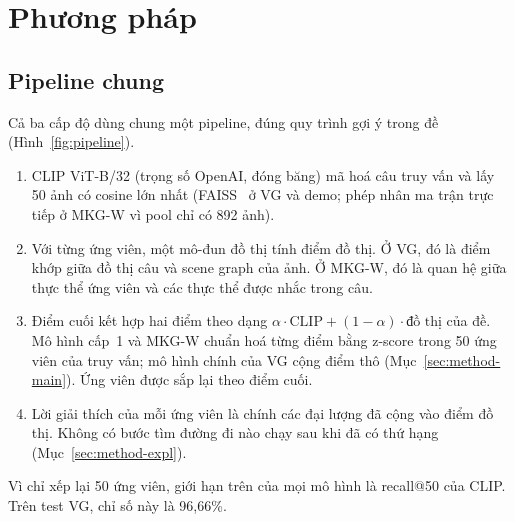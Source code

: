 \section{Phương pháp}
\label{sec:method}

\subsection{Pipeline chung}

Cả ba cấp độ dùng chung một pipeline, đúng quy trình gợi ý trong đề (Hình~\ref{fig:pipeline}).
\begin{enumerate}
\item CLIP ViT-B/32 (trọng số OpenAI, đóng băng) mã hoá câu truy vấn và lấy 50 ảnh có cosine lớn nhất (FAISS~\cite{johnson2019faiss}
ở VG và demo; phép nhân ma trận trực tiếp ở MKG-W vì pool chỉ có 892 ảnh).
\item Với từng ứng viên, một mô-đun đồ thị tính điểm đồ thị. Ở VG, đó là điểm khớp giữa đồ thị câu và scene graph của ảnh.
Ở MKG-W, đó là quan hệ giữa thực thể ứng viên và các thực thể được nhắc trong câu.
\item Điểm cuối kết hợp hai điểm theo dạng $\alpha\cdot\text{CLIP} + (1-\alpha)\cdot\text{đồ thị}$ của đề. Mô hình cấp~1
và MKG-W chuẩn hoá từng điểm bằng z-score trong 50 ứng viên của truy vấn; mô hình chính của VG cộng điểm thô
(Mục~\ref{sec:method-main}). Ứng viên được sắp lại theo điểm cuối.
\item Lời giải thích của mỗi ứng viên là chính các đại lượng đã cộng vào điểm đồ thị. Không có bước tìm đường đi nào chạy
sau khi đã có thứ hạng (Mục~\ref{sec:method-expl}).
\end{enumerate}
Vì chỉ xếp lại 50 ứng viên, giới hạn trên của mọi mô hình là recall@50 của CLIP. Trên test VG, chỉ số này là 96,66\%.

